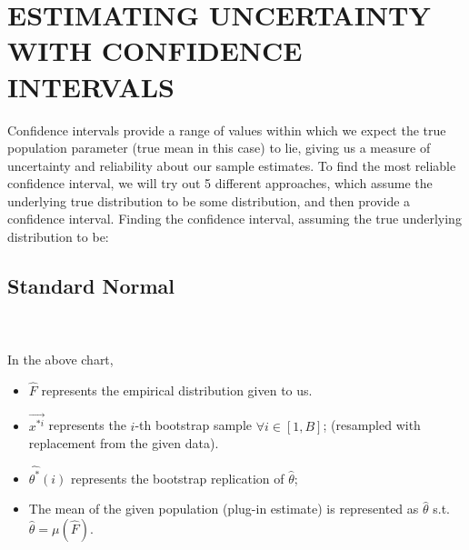 \documentclass[conference]{IEEEtran}
\begin{document}
\section{ESTIMATING UNCERTAINTY WITH CONFIDENCE INTERVALS}
Confidence intervals provide a range of values within which we expect the true population parameter (true mean in this case) to lie, giving us a measure of uncertainty and reliability about our sample estimates. To find the most reliable confidence interval, we will try out 5 different approaches, which assume the underlying true distribution to be some distribution, and then provide a confidence interval.
Finding the confidence interval, assuming the true underlying distribution to be:

\subsection{Standard Normal}
\\  \\
In the above chart, 
\begin{itemize}
    \item $\hat{F}$ represents the empirical distribution given to us.
    \item {$\vec{x^{*i}}$} represents the $i$-th bootstrap sample $\forall i \in [1, B]$; (resampled with replacement from the given data).
    \item $\hat{\theta^*}(i)$ represents the bootstrap replication of $\hat{\theta}$; 
    \item The mean of the given population (plug-in estimate) is represented as $\hat{\theta}$ s.t. $\hat{\theta} = \mu(\hat{F}) $.
\end{itemize}
\end{document}
